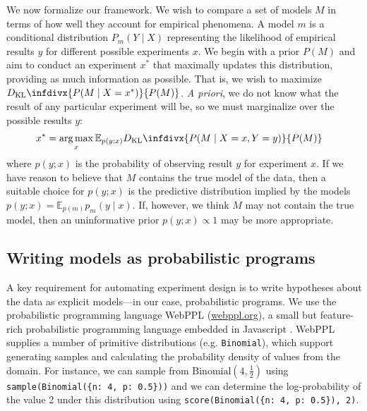 \documentclass{article}
\newcommand{\dkl}{D_\mathrm{KL}\infdivx}
\DeclareMathOperator*{\argmax}{arg\,max}
\begin{document}
We now formalize our framework.
We wish to compare a set of models $M$ in terms of how well they account for empirical phenomena.
A model $m$ is a conditional distribution $P_m(Y \mid X)$ representing the likelihood of empirical results $y$ for different possible experiments $x$.
We begin with a prior $P(M)$ and aim to conduct an experiment $x^*$ that maximally updates this distribution, providing as much information as possible.
That is, we wish to maximize $\dkl{ P(M \mid X = x^*) }{ P(M) }$.
\emph{A priori}, we do not know what the result of any particular experiment will be, so we must marginalize over the possible results $y$:
\begin{align}
  x^{*} &= \argmax_{x} {\mathbb E}_{p(y ; x)} \dkl{ P(M \mid X = x, Y = y) }{ P(M) }  \label{eq:oed}
\end{align}
where $p(y ; x)$ is the probability of observing result $y$ for experiment $x$.
If we have reason to believe that $M$ contains the true model of the data, then a suitable choice for $p(y ; x)$ is the predictive distribution implied by the models $p(y ; x) = {\mathbb E}_{p(m)} p_m(y \mid x)$.
If, however, we think $M$ may not contain the true model, then an uninformative prior $p(y ; x) \propto 1$ may be more appropriate.

\subsection{Writing models as probabilistic programs}

A key requirement for automating experiment design is to write hypotheses about the data as explicit models---in our case, probabilistic programs.
We use the probabilistic programming language WebPPL (\url{webppl.org}), a small but feature-rich probabilistic programming language embedded in Javascript \cite{dippl}.
WebPPL supplies a number of primitive distributions (e.g. \lstinline{Binomial}), which support generating samples and calculating the probability density of values from the domain.
For instance, we can sample from $\text{Binomial}(4, \frac{1}{2})$ using \lstinline|sample(Binomial({n: 4, p: 0.5}))| and we can determine the log-probability of the value 2 under this distribution using \lstinline|score(Binomial({n: 4, p: 0.5}), 2)|.
\end{document}
